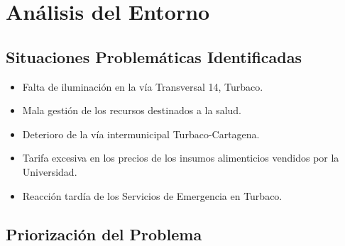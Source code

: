 \documentclass[letterpaper, 11pt]{report}
\begin{document}
\section{Análisis del Entorno}

\subsection{Situaciones Problemáticas Identificadas}

\begin{itemize}
      \item Falta de iluminación en la vía Transversal 14, Turbaco.
      \item Mala gestión de los recursos destinados a la salud.
      \item Deterioro de la vía intermunicipal Turbaco-Cartagena.
      \item Tarifa excesiva en los precios de los insumos alimenticios vendidos por la
            Universidad.
      \item Reacción tardía de los Servicios de Emergencia en Turbaco.
\end{itemize}

\subsection{Priorización del Problema}
\end{document}
